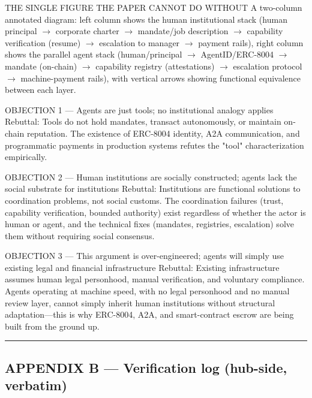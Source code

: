 \documentclass[
]{article}
\begin{document}
THE SINGLE FIGURE THE PAPER CANNOT DO WITHOUT A two-column annotated
diagram: left column shows the human institutional stack (human
principal $\rightarrow$ corporate charter $\rightarrow$ mandate/job description $\rightarrow$ capability
verification (resume) $\rightarrow$ escalation to manager $\rightarrow$ payment rails), right
column shows the parallel agent stack (human/principal $\rightarrow$
AgentID/ERC-8004 $\rightarrow$ mandate (on-chain) $\rightarrow$ capability registry
(attestations) $\rightarrow$ escalation protocol $\rightarrow$ machine-payment rails), with
vertical arrows showing functional equivalence between each layer.

OBJECTION 1 --- Agents are just tools; no institutional analogy applies
Rebuttal: Tools do not hold mandates, transact autonomously, or maintain
on-chain reputation. The existence of ERC-8004 identity, A2A
communication, and programmatic payments in production systems refutes
the "tool" characterization empirically.

OBJECTION 2 --- Human institutions are socially constructed; agents lack
the social substrate for institutions Rebuttal: Institutions are
functional solutions to coordination problems, not social customs. The
coordination failures (trust, capability verification, bounded
authority) exist regardless of whether the actor is human or agent, and
the technical fixes (mandates, registries, escalation) solve them
without requiring social consensus.

OBJECTION 3 --- This argument is over-engineered; agents will simply use
existing legal and financial infrastructure Rebuttal: Existing
infrastructure assumes human legal personhood, manual verification, and
voluntary compliance. Agents operating at machine speed, with no legal
personhood and no manual review layer, cannot simply inherit human
institutions without structural adaptation---this is why ERC-8004, A2A,
and smart-contract escrow are being built from the ground up.

\begin{center}\rule{0.5\linewidth}{0.5pt}\end{center}

\subsection{APPENDIX B --- Verification log (hub-side,
verbatim)}\label{appendix-b--verification-log-hub-side-verbatim}
\end{document}
